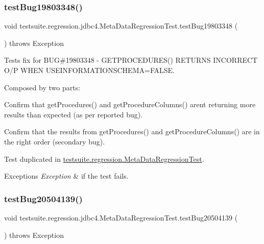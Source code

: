 \subsubsection{\texorpdfstring{test\+Bug19803348()}{testBug19803348()}}
{\footnotesize\ttfamily void testsuite.\+regression.\+jdbc4.\+Meta\+Data\+Regression\+Test.\+test\+Bug19803348 (\begin{DoxyParamCaption}{ }\end{DoxyParamCaption}) throws Exception}

Tests fix for B\+UG\#19803348 -\/ G\+E\+T\+P\+R\+O\+C\+E\+D\+U\+R\+E\+S() R\+E\+T\+U\+R\+NS I\+N\+C\+O\+R\+R\+E\+CT O/P W\+H\+EN U\+S\+E\+I\+N\+F\+O\+R\+M\+A\+T\+I\+O\+N\+S\+C\+H\+E\+MA=F\+A\+L\+SE.

Composed by two parts\+:
\begin{DoxyEnumerate}
\item Confirm that get\+Procedures() and get\+Procedure\+Columns() aren\textquotesingle{}t returning more results than expected (as per reported bug).
\item Confirm that the results from get\+Procedures() and get\+Procedure\+Columns() are in the right order (secondary bug).
\end{DoxyEnumerate}

Test duplicated in \mbox{\hyperlink{classtestsuite_1_1regression_1_1_meta_data_regression_test}{testsuite.\+regression.\+Meta\+Data\+Regression\+Test}}.


\begin{DoxyExceptions}{Exceptions}
{\em Exception} & if the test fails. \\
\hline
\end{DoxyExceptions}
\mbox{\label{classtestsuite_1_1regression_1_1jdbc4_1_1_meta_data_regression_test_a04df0e3f36bc701796c1c6168bd10320}} 
\subsubsection{\texorpdfstring{test\+Bug20504139()}{testBug20504139()}}
{\footnotesize\ttfamily void testsuite.\+regression.\+jdbc4.\+Meta\+Data\+Regression\+Test.\+test\+Bug20504139 (\begin{DoxyParamCaption}{ }\end{DoxyParamCaption}) throws Exception}

